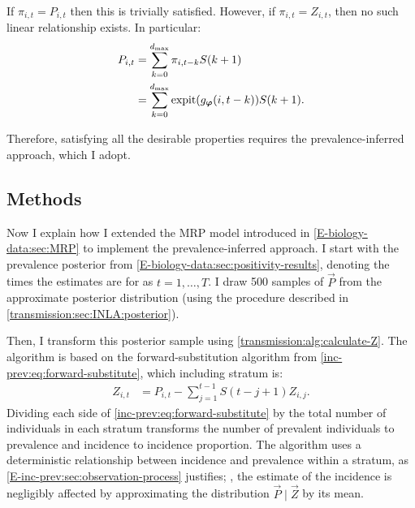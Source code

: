 \documentclass[thesis.tex]{subfiles}
\begin{document}
If $\pi_{i,t} = P_{i,t}$ then this is trivially satisfied.
However, if $\pi_{i,t} = Z_{i,t}$, then no such linear relationship exists.
In particular:
\begin{align}
    P_{i,t}
    &= \sum_{k=0}^{d_\text{max}} \pi_{i,t-k} S(k+1) \\
    &= \sum_{k=0}^{d_\text{max}} \operatorname{expit}(g_{\bm{\varphi}}(i, t-k)) S(k+1).
\end{align}

Therefore, satisfying all the desirable properties requires the prevalence-inferred approach, which I adopt.

\subsection{Methods} \label{backcalc:sec:methods}

Now I explain how I extended the MRP model introduced in \cref{E-biology-data:sec:MRP} to implement the prevalence-inferred approach.
I start with the prevalence posterior from \cref{E-biology-data:sec:positivity-results}, denoting the times the estimates are for as $t = 1, \dots, T$.
I draw 500 samples of $\vec{P}$ from the approximate posterior distribution (using the procedure described in \cref{transmission:sec:INLA:posterior}).

Then, I transform this posterior sample using \cref{transmission:alg:calculate-Z}.
The algorithm is based on the forward-substitution algorithm from \cref{inc-prev:eq:forward-substitute}, which including stratum is:
\begin{align}
Z_{i,t}
&= P_{i,t} - \sum_{j=1}^{t-1} S(t - j + 1) Z_{i,j}.
\label{transmission:eq:forward-substitute}
\end{align}
Dividing each side of \cref{inc-prev:eq:forward-substitute} by the total number of individuals in each stratum transforms the number of prevalent individuals to prevalence and incidence to incidence proportion.
The algorithm uses a deterministic relationship between incidence and prevalence within a stratum, as \cref{E-inc-prev:sec:observation-process} justifies; \ie, the estimate of the incidence is negligibly affected by approximating the distribution $\vec{P} \mid \vec{Z}$ by its mean.

\begin{algorithm}
    \caption{%
      Algorithm to transform 500 posterior samples posterior samples of $\vec{P}$ to posterior samples of $\vec{Z}$.
      Assumes constant incidence for $t \leq 1$ where $t = 1$ is the first day of prevalence data.
      Calculation of $Z^{(j)}_{i,t}$ is from \cref{transmission:eq:forward-substitute}.
    }
    \label{transmission:alg:calculate-Z}
\end{algorithm}
\end{document}
